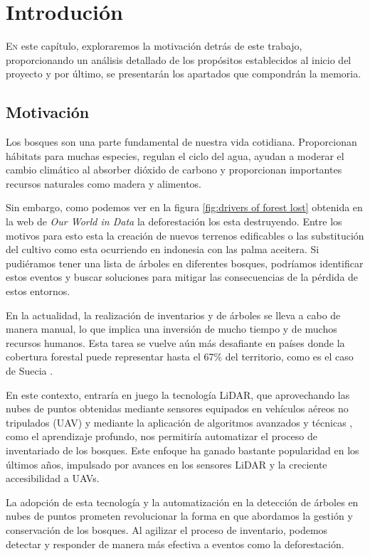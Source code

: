 \chapter{Introdución}
\label{chap:introducion}

\lettrine{E}{n} este capítulo, exploraremos la motivación detrás de este trabajo, proporcionando un análisis detallado de los propósitos establecidos al inicio del proyecto y por último, se presentarán los apartados que compondrán la memoria.



\section{Motivación}
\label{sec:motivacion}
Los bosques son una parte fundamental de nuestra vida cotidiana. Proporcionan hábitats para muchas especies, regulan el ciclo del agua, ayudan a moderar el cambio climático al absorber dióxido de carbono y proporcionan importantes recursos naturales como  madera y  alimentos.

Sin embargo, como podemos ver en la figura \ref{fig:drivers of forest lost} obtenida en la web de \textit{Our World in Data} \cite{owidforestsanddeforestation} la deforestación los esta destruyendo. Entre los motivos para esto esta la creación de nuevos terrenos edificables o las substitución del cultivo como esta ocurriendo en indonesia con las palma aceitera. Si pudiéramos tener una lista de árboles en diferentes bosques, podríamos identificar estos eventos y buscar soluciones para mitigar las consecuencias de la pérdida de estos entornos.

En la actualidad, la realización de inventarios y  de árboles se lleva a cabo de manera manual, lo que implica una inversión de mucho tiempo y de muchos recursos humanos. Esta tarea se vuelve aún más desafiante en países donde la cobertura forestal puede representar hasta el 67\% del territorio, como es el caso de Suecia \cite{sweeden}.

En este contexto, entraría en juego la tecnología LiDAR, que aprovechando las nubes de puntos obtenidas mediante sensores equipados en vehículos aéreos no tripulados (UAV) y mediante la aplicación de algoritmos avanzados y técnicas , como el aprendizaje profundo, nos permitiría automatizar el proceso de inventariado de los bosques. Este enfoque ha ganado  bastante popularidad en los últimos años, impulsado por avances en los sensores LiDAR y la creciente accesibilidad a UAVs.

La adopción de esta tecnología y la automatización en la detección de árboles en nubes de puntos prometen revolucionar la forma en que abordamos la gestión y conservación de los bosques. Al agilizar el proceso de inventario, podemos detectar y responder de manera más efectiva a eventos como la deforestación.

